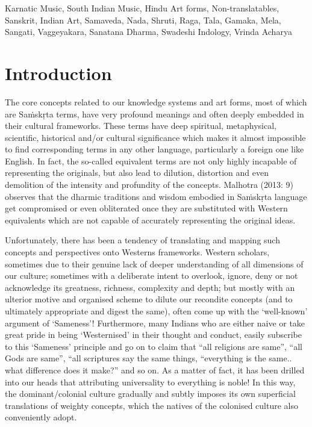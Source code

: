 \vspace{-.2cm}

Karnatic Music, South Indian Music, Hindu Art forms, Non-translata\-bles, Sanskrit, Indian Art, Samaveda, Nada, Shruti, Raga, Tala, Gamaka, Mela, Sangati, Vaggeyakara, Sanatana Dharma, Swadeshi Indology, Vrinda Acharya

\vspace{-.2cm}

\section*{Introduction}

\vspace{-.2cm}

The core concepts related to our knowledge systems and art forms, most of which are Saṁskṛta terms, have very profound meanings and often deeply embedded in their cultural frameworks. These terms have deep spiritual, metaphysical, scientific, historical and/or cultural significance which makes it almost impossible to find corresponding terms in any other language, particularly a foreign one like English. In fact, the so-called equivalent terms are not only highly incapable of representing the originals, but also lead to dilution, distortion and even demolition of the intensity and profundity of the concepts. Malhotra (2013: 9) observes that the dharmic traditions and wisdom embodied in Saṁskṛta language get compromised or even obliterated once they are substituted with Western equivalents which are not capable of accurately representing the original ideas.

Unfortunately, there has been a tendency of translating and mapping such concepts and perspectives onto Westerns frameworks. Western scholars, sometimes due to their genuine lack of deeper understanding of all dimensions of our culture; sometimes with a deliberate intent to overlook, ignore, deny or not acknowledge its greatness, richness, complexity and depth; but mostly with an ulterior motive and organised scheme to dilute our recondite concepts (and to ultimately appropriate and digest the same), often come up with the ‘well-known’ argument of ‘Sameness’! Furthermore, many Indians who are either naive or take great pride in being ‘Westernised’ in their thought and conduct, easily subscribe to this ‘Sameness’ principle and go on to claim that “all religions are same”, “all Gods are same”, “all scriptures say the same things, “everything is the same.. what difference does it make?” and so on. As a matter of fact, it has been drilled into our heads that attributing universality to everything is noble! In this way, the dominant/colonial culture gradually and subtly imposes its own superficial translations of weighty concepts, which the natives of the colonised culture also conveniently adopt.

